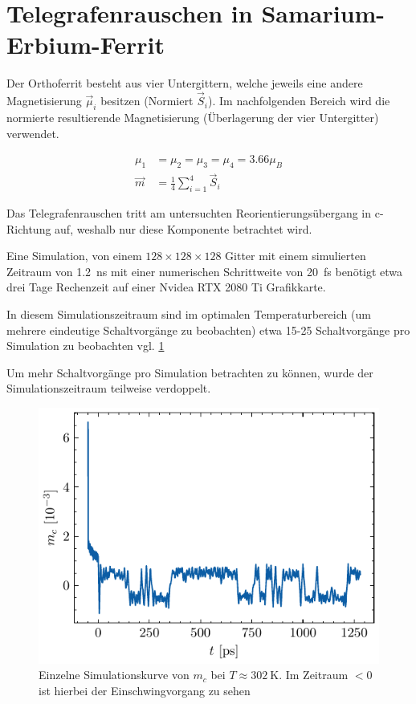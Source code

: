\documentclass[main.tex]{subfiles}
\begin{document}
\newpage
\section{Telegrafenrauschen in Samarium-Erbium-Ferrit}

Der Orthoferrit besteht aus vier Untergittern, welche jeweils eine andere Magnetisierung \(\vec{\mu}_i\) besitzen (Normiert \(\vec{S}_i\)). Im nachfolgenden Bereich wird die normierte resultierende Magnetisierung (Überlagerung der vier Untergitter) verwendet.

\begin{align}
    \mu_{1} &=  \mu_{2} = \mu_{3} = \mu_{4} = \num{3.66}\mu_B \\
    \vec{m} &= \frac{1}{4} \sum_{i=1}^4 \vec{S}_i
\end{align}

Das Telegrafenrauschen tritt am untersuchten Reorientierungsübergang in c-Richtung auf, weshalb nur diese Komponente betrachtet wird. 


Eine Simulation, von einem \(128 \times 128 \times 128\) Gitter mit einem simulierten Zeitraum von \SI{1.2}{\nano\second} mit einer numerischen Schrittweite von \SI{20}{\femto\second} benötigt etwa drei Tage Rechenzeit auf einer Nvidea RTX 2080 Ti Grafikkarte. 

In diesem Simulationszeitraum sind im optimalen Temperaturbereich (um mehrere eindeutige Schaltvorgänge zu beobachten) etwa 15-25 Schaltvorgänge pro Simulation zu beobachten vgl. \cref{fig:bsp-run}

Um mehr Schaltvorgänge pro Simulation betrachten zu können, wurde der Simulationszeitraum teilweise verdoppelt.

\begin{figure}[h]
    \centering
    \includegraphics{bilder/plots/theo-vis/example-telegraph-sim.pdf}
    \caption{Einzelne Simulationskurve von \(m_c\) bei \(T \approx \SI{302}{\kelvin}\). Im Zeitraum \(<0\) ist hierbei der Einschwingvorgang zu sehen}\label{fig:bsp-run}
\end{figure}
\end{document}
